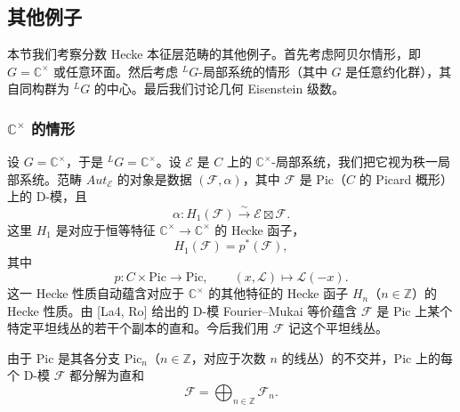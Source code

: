 \documentclass[11pt,a4paper]{article}
\begin{document}

\subsection{其他例子}

本节我们考察分数 Hecke 本征层范畴的其他例子。首先考虑阿贝尔情形，即 $G = \mathbb{C}^\times$ 或任意环面。然后考虑 ${}^LG$-局部系统的情形（其中 $G$ 是任意约化群），其自同构群为 ${}^LG$ 的中心。最后我们讨论几何 Eisenstein 级数。

\subsubsection{\texorpdfstring{$\mathbb{C}^\times$}{C×} 的情形}

设 $G = \mathbb{C}^\times$，于是 ${}^LG = \mathbb{C}^\times$。设 $\mathcal{E}$ 是 $C$ 上的 $\mathbb{C}^\times$-局部系统，我们把它视为秩一局部系统。范畴 $Aut_{\mathcal{E}}$ 的对象是数据 $(\mathcal{F},\alpha)$，其中 $\mathcal{F}$ 是 $\mathrm{Pic}$（$C$ 的 Picard 概形）上的 D-模，且
\begin{equation}\tag{6.12}
\alpha : H_1(\mathcal{F})\xrightarrow{\sim}\mathcal{E}\boxtimes\mathcal{F}.
\end{equation}
这里 $H_1$ 是对应于恒等特征 $\mathbb{C}^\times\to\mathbb{C}^\times$ 的 Hecke 函子，
\[
H_1(\mathcal{F}) = p^{*}(\mathcal{F}),
\]
其中
\[
p : C\times\mathrm{Pic}\to\mathrm{Pic},\qquad (x,\mathcal{L})\mapsto\mathcal{L}(-x).
\]
这一 Hecke 性质自动蕴含对应于 $\mathbb{C}^\times$ 的其他特征的 Hecke 函子 $H_n$（$n\in\mathbb{Z}$）的 Hecke 性质。由 [La4, Ro] 给出的 D-模 Fourier--Mukai 等价蕴含 $\mathcal{F}$ 是 $\mathrm{Pic}$ 上某个特定平坦线丛的若干个副本的直和。今后我们用 $\mathcal{F}$ 记这个平坦线丛。


由于 $\mathrm{Pic}$ 是其各分支 $\mathrm{Pic}_n$（$n\in\mathbb{Z}$，对应于次数 $n$ 的线丛）的不交并，$\mathrm{Pic}$ 上的每个 D-模 $\mathcal{F}$ 都分解为直和
\begin{equation}\tag{6.13}
\mathcal{F} = \bigoplus_{n\in\mathbb{Z}}\mathcal{F}_n.
\end{equation}
\end{document}
